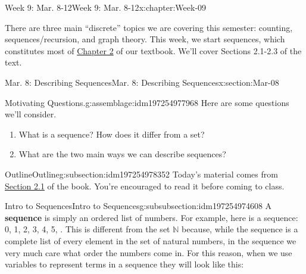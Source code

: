 \documentclass[oneside,10pt,]{book}
\newcommand{\terminology}[1]{\textbf{#1}}
\numberwithin{equation}{section}
\def\N{{\mathbb N}}
\newcommand{\N}{\mathbb N}
\begin{document}
\begin{chapterptx}{Week 9: Mar. 8-12}{}{Week 9: Mar. 8-12}{}{}{x:chapter:Week-09}
\begin{introduction}{}%
There are three main ``discrete'' topics we are covering this semester: counting, sequences\slash{}recursion, and graph theory. This week, we start sequences, which constitutes most of \href{http://discrete.openmathbooks.org/dmoi3/ch_sequences.html}{Chapter 2} of our textbook. We'll cover Sections 2.1-2.3 of the text.%
\end{introduction}%
%
%
\typeout{************************************************}
\typeout{************************************************}
%
\begin{sectionptx}{Mar. 8: Describing Sequences}{}{Mar. 8: Describing Sequences}{}{}{x:section:Mar-08}
\begin{introduction}{}%
\begin{assemblage}{Motivating Questions.}{g:assemblage:idm197254977968}%
Here are some questions we'll consider. %
\begin{enumerate}
\item{}What is a sequence? How does it differ from a set?%
\item{}What are the two main ways we can describe sequences?%
\end{enumerate}
%
\end{assemblage}
\end{introduction}%
%
%
\typeout{************************************************}
\typeout{************************************************}
%
\begin{subsectionptx}{Outline}{}{Outline}{}{}{g:subsection:idm197254978352}
Today's material comes from \href{http://discrete.openmathbooks.org/dmoi3/sec_seq_intro.html}{Section 2.1} of the book. You're encouraged to read it before coming to class.%
%
%
\typeout{************************************************}
\typeout{************************************************}
%
\begin{subsubsectionptx}{Intro to Sequences}{}{Intro to Sequences}{}{}{g:subsubsection:idm197254974608}
A \terminology{sequence}  is simply an ordered list of numbers. For example, here is a sequence: 0, 1, 2, 3, 4, 5, \textellipsis{}. This is different from the set \(\N\) because, while the sequence is a complete list of every element in the set of natural numbers, in the sequence we very much care what order the numbers come in. For this reason, when we use variables to represent terms in a sequence they will look like this:%

\end{subsubsectionptx}
\end{subsectionptx}
\end{sectionptx}
\end{chapterptx}
\end{document}
